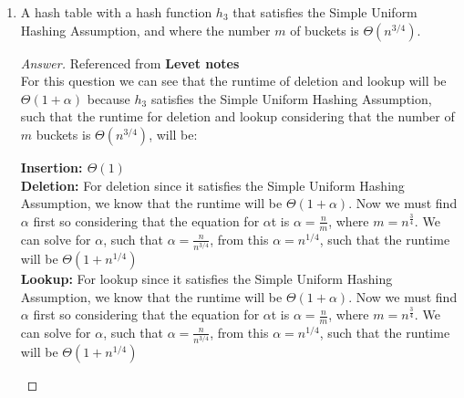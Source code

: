 \documentclass[11pt]{article}
\theoremstyle{definition}
\theoremstyle{definition}
\theoremstyle{definition}
\begin{document}
\begin{enumerate}[label=(\alph*)]
\begin{proof}[Answer]
\begin{itemize}
\begin{center}
$\Theta(1) < \Theta(\log n)$
\end{center}
\item \textbf{Deletion:} The runtime of the deletion operation for a hash table that satisfies the Simple Uniform Hashing Assumption will have a runtime of $\Theta(2)$, such that the runtime of the deletion operation in a hashing function will run faster than the deletion in balanced binary tree, as follows: \\
\begin{center}
$\Theta(2) < \Theta(\log n)$
\end{center}
\item \textbf{Lookup:} The runtime of the deletion operation for a hash table that satisfies the Simple Uniform Hashing Assumption will have a runtime of $\Theta(2)$, such that the runtime of the lookup operation in a hashing function will run faster than the lookup in balanced binary tree, as follows: \\
\begin{center}
$\Theta(2) <\Theta(\log n)$
\end{center}
\end{itemize}
\end{proof}
    
    \vskip 15pt	
    \item A hash table with a hash function $h_3$ that satisfies the Simple Uniform Hashing Assumption, and where the number $m$ of buckets is $\Theta(n^{3/4})$.
    \begin{proof}[Answer] Referenced from \textbf{Levet notes}\\
        For this question we can see that the runtime of deletion and lookup will be $\Theta(1+\alpha)$ because $h_3$ satisfies the Simple Uniform Hashing Assumption, such that the runtime for deletion and lookup considering that the number of $m$ buckets is $\Theta(n^{3/4})$, will be: \\
        \begin{center}
        \textbf{Insertion: $\Theta(1)$} \\
        \textbf{Deletion:} For deletion since it satisfies the Simple Uniform Hashing Assumption, we know that the runtime will be $\Theta(1+\alpha)$. Now we must find $\alpha$ first so considering that the equation for $\alpha$t is $\alpha = \frac{n}{m}$, where $m = n^{\frac{3}{4}}$. We can solve for $\alpha$, such that $\alpha = \frac{n}{n^{3/4}}$, from this $\alpha = n^{1/4}$, such that the runtime will be $\Theta(1+ n^{1/4})$ \\
        \textbf{Lookup: } For lookup since it satisfies the Simple Uniform Hashing Assumption, we know that the runtime will be $\Theta(1+\alpha)$. Now we must find $\alpha$ first so considering that the equation for $\alpha$t is $\alpha = \frac{n}{m}$, where $m = n^{\frac{3}{4}}$. We can solve for $\alpha$, such that $\alpha = \frac{n}{n^{3/4}}$, from this $\alpha =  n^{1/4}$, such that the runtime will be $\Theta(1+ n^{1/4})$ \\
        \end{center}
        

\end{proof}
\end{enumerate}
\end{document}
